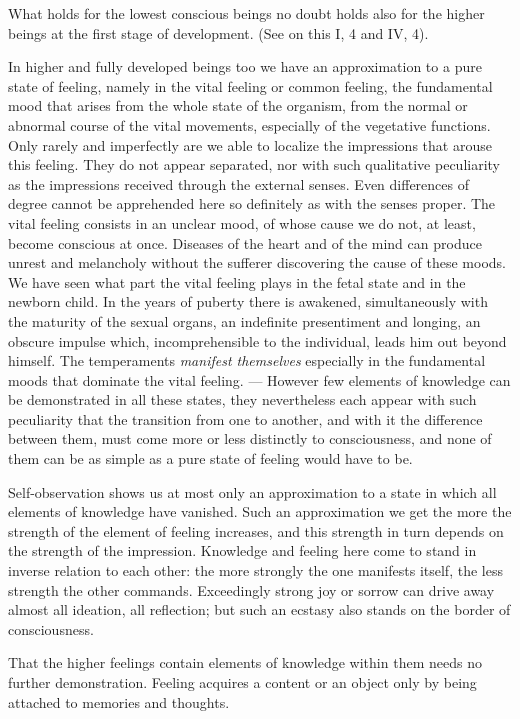 \documentclass[12pt,a4paper]{book}
\newcommand{\opage}[1]{\marginnote{\footnotesize\textit{[#1]}}}
\begin{document}
What holds for the lowest conscious beings no doubt holds also for the
higher beings at the first stage of development. (See on this I, 4 and
IV, 4).

In higher and fully developed beings too we have an approximation to a
pure state of feeling, namely in the vital feeling or common feeling, the
fundamental mood that arises from the whole state of the organism, from
the normal or abnormal course of the vital movements, especially of the
\opage{116}vegetative functions. Only rarely and imperfectly are we able
to localize the impressions that arouse this feeling. They do not appear
separated, nor with such qualitative peculiarity as the impressions
received through the external senses. Even differences of degree cannot
be apprehended here so definitely as with the senses proper. The vital
feeling consists in an unclear mood, of whose cause we do not, at least,
become conscious at once. Diseases of the heart and of the mind can
produce unrest and melancholy without the sufferer discovering the cause
of these moods. We have seen what part the vital feeling plays in the
fetal state and in the newborn child. In the years of puberty there is
awakened, simultaneously with the maturity of the sexual organs, an
indefinite presentiment and longing, an obscure impulse which,
incomprehensible to the individual, leads him out beyond himself. The
temperaments \emph{manifest themselves} especially in the fundamental
moods that dominate the vital feeling. --- However few elements of
knowledge can be demonstrated in all these states, they nevertheless each
appear with such peculiarity that the transition from one to another,
and with it the difference between them, must come more or less
distinctly to consciousness, and none of them can be as simple as a pure
state of feeling would have to be.

Self-observation shows us at most only an approximation to a state in
which all elements of knowledge have vanished. Such an approximation we
get the more the strength of the element of feeling increases, and this
strength in turn depends on the strength of the impression. Knowledge
and feeling here come to stand in inverse relation to each other: the
more strongly the one manifests itself, the less strength the other
commands. Exceedingly strong joy or sorrow can drive away almost all
ideation, all reflection; but such an ecstasy also stands on the border
of consciousness.

That the higher feelings contain elements of knowledge within them needs
no further demonstration. Feeling acquires a content or an object only
by being attached to memories and thoughts.
\end{document}
